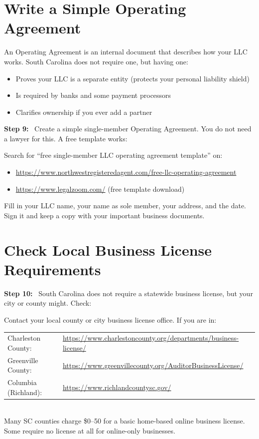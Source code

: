 \documentclass[12pt, letterpaper, oneside]{book}
\newcommand{\step}[1]{\noindent\textbf{\textcolor{primary}{Step #1:}}~}
\begin{document}
\section{Write a Simple Operating Agreement}

An Operating Agreement is an internal document that describes how your LLC works. South Carolina does not require one, but having one:
\begin{itemize}[leftmargin=2em]
  \item Proves your LLC is a separate entity (protects your personal liability shield)
  \item Is required by banks and some payment processors
  \item Clarifies ownership if you ever add a partner
\end{itemize}

\step{9} Create a simple single-member Operating Agreement. You do not need a lawyer for this. A free template works:
\begin{actionbox}
Search for ``free single-member LLC operating agreement template'' on:
\begin{itemize}[leftmargin=1.5em]
  \item \url{https://www.northwestregisteredagent.com/free-llc-operating-agreement}
  \item \url{https://www.legalzoom.com/} (free template download)
\end{itemize}
Fill in your LLC name, your name as sole member, your address, and the date.\\
Sign it and keep a copy with your important business documents.
\end{actionbox}

\section{Check Local Business License Requirements}

\step{10} South Carolina does not require a statewide business license, but your city or county might. Check:
\begin{actionbox}
Contact your local county or city business license office. If you are in:\\[4pt]
\begin{tabular}{ll}
  Charleston County: & \url{https://www.charlestoncounty.org/departments/business-license/} \\
  Greenville County: & \url{https://www.greenvillecounty.org/AuditorBusinessLicense/} \\
  Columbia (Richland): & \url{https://www.richlandcountysc.gov/} \\
\end{tabular}\\[8pt]
Many SC counties charge \$0--50 for a basic home-based online business license. Some require no license at all for online-only businesses.
\end{actionbox}
\end{document}
